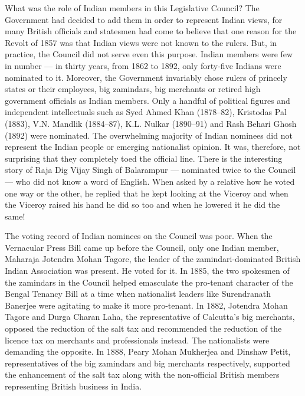 What was the role of Indian members in this Legislative Council? The Government had decided to add them in order to represent Indian views, for many British officials and statesmen had come to believe that one reason for the Revolt of 1857 was that Indian views were not known to the rulers. But, in practice, the Council did not serve even this purpose. Indian members were few in number --- in thirty years, from 1862 to 1892, only forty-five Indians were nominated to it. Moreover, the Government invariably chose rulers of princely states or their employees, big zamindars, big merchants or retired high government officials as Indian members. Only a handful of political figures and independent intellectuals such as Syed Ahmed Khan (1878--82), Kristodas Pal (1883), V.N. Mandlik (1884--87), K.L. Nulkar (1890--91) and Rash Behari Ghosh (1892) were nominated. The overwhelming majority of Indian nominees did not represent the Indian people or emerging nationalist opinion. It was, therefore, not surprising that they completely toed the official line. There is the interesting story of Raja Dig Vijay Singh of Balarampur --- nominated twice to the Council --- who did not know a word of English. When asked by a relative how he voted one way or the other, he replied that he kept looking at the Viceroy and when the Viceroy raised his hand he did so too and when he lowered it he did the same!

The voting record of Indian nominees on the Council was poor. When the Vernacular Press Bill came up before the Council, only one Indian member, Maharaja Jotendra Mohan Tagore, the leader of the zamindari-dominated British Indian Association was present. He voted for it. In 1885, the two spokesmen of the zamindars in the Council helped emasculate the pro-tenant character of the Bengal Tenancy Bill at a time when nationalist leaders like Surendranath Banerjee were agitating to make it more pro-tenant. In 1882, Jotendra Mohan Tagore and Durga Charan Laha, the representative of Calcutta's big merchants, opposed the reduction of the salt tax and recommended the reduction of the licence tax on merchants and professionals instead. The nationalists were demanding the opposite. In 1888, Peary Mohan Mukherjea and Dinshaw Petit, representatives of the big zamindars and big merchants respectively, supported the enhancement of the salt tax along with the non-official British members representing British business in India.

